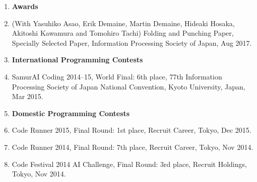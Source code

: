 \begin{enumerate}
  \item[] {\bf Awards}
  \item (With Yasuhiko Asao, Erik Demaine, Martin Demaine, Hideaki Hosaka, Akitoshi Kawamura and Tomohiro Tachi) Folding and Punching Paper, Specially Selected Paper, Information Processing Society of Japan, Aug 2017.
  \item[] {\bf International Programming Contests}
  \item SamurAI Coding 2014--15, World Final: 6th place, 77th Information Processing Society of Japan National Convention, Kyoto University, Japan, Mar 2015.
  \item[] {\bf Domestic Programming Contests}
  \item Code Runner 2015, Final Round: 1st place, Recruit Career, Tokyo, Dec 2015.
  \item Code Runner 2014, Final Round: 7th place, Recruit Career, Tokyo, Nov 2014.
  \item Code Festival 2014 AI Challenge, Final Round: 3rd place, Recruit Holdings, Tokyo, Nov 2014.
\end{enumerate}



